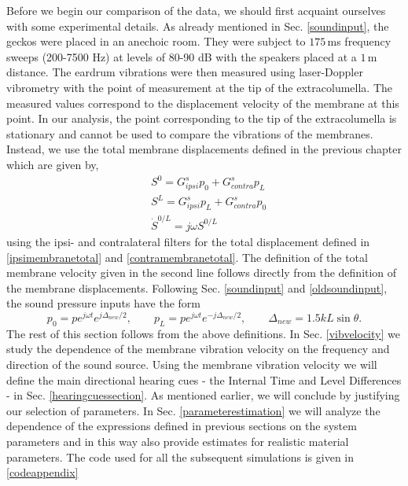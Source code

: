 Before we begin our comparison of the data, we should first acquaint ourselves with some experimental details. As already mentioned in Sec. \ref{soundinput}, the geckos were placed in
an anechoic room. They were subject to $175\,$ms frequency sweeps (200-7500 Hz) at levels of 80-90 dB with the speakers placed at
a $1\,$m distance. The eardrum vibrations were then measured using laser-Doppler vibrometry with the point
of measurement at the tip of the extracolumella. The measured values correspond to the displacement velocity of the membrane at this point.  
In our analysis, the point corresponding to the tip of the extracolumella is stationary and cannot be used to compare the vibrations of the membranes. 
Instead, we use the total membrane displacements defined in the previous chapter which are given by,
\begin{align}
 &S^0=G^s_{ipsi}p_0+G^s_{contra} p_L\\
 &S^L=G^s_{ipsi}p_L+G^s_{contra}p_0\\
 &\dot{S}^{0/L}=j\omega S^{0/L}\label{totalvelocity}
\end{align}
using the ipsi- and contralateral filters for the total displacement defined in \eqref{ipsimembranetotal} and \eqref{contramembranetotal}.
The definition of the total membrane velocity given in the second line follows directly from the definition of the membrane displacements. Following Sec. \ref{soundinput}
and \eqref{oldsoundinput}, the sound pressure inputs have the form
\begin{equation}\label{newsoundinput}
 p_0=pe^{j\omega t} e^{j\Delta_{new}/2},\qquad p_L=pe^{j\omega t} e^{-j\Delta_{new}/2},\qquad \Delta_{new}=1.5kL\sin\theta.
\end{equation}
The rest of this section follows from the above definitions. In Sec. \ref{vibvelocity} we study the dependence of the membrane vibration velocity 
on the frequency and direction of the sound source. Using the membrane vibration velocity we will define the main directional hearing cues
 - the Internal Time and Level Differences - in Sec. \ref{hearingcuessection}. As mentioned earlier, we will conclude by justifying our selection of parameters. In
Sec. \ref{parameterestimation} we will analyze the dependence of the expressions defined in previous sections on the system parameters 
and in this way also provide estimates for realistic material parameters.  The code used for all the subsequent simulations is given in \ref{codeappendix}

